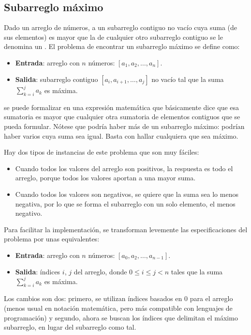 \subsection{Subarreglo máximo}

Dado un arreglo de números, a un subarreglo contiguo no vacío cuya suma (de sus elementos) es mayor que la de cualquier otro subarreglo contiguo se le denomina un . El problema de encontrar un subarreglo máximo se define como:
\begin{itemize}
  \item \textbf{Entrada}: arreglo con $n$ números: $[a_1, a_2,\ldots,a_n]$.
  \item \textbf{Salida}: subarreglo contiguo $[a_i, a_{i+1},\ldots,a_j]$ no vacío tal que la suma $\sum_{k=i}^j a_k$ es máxima.
\end{itemize}
 se puede formalizar en una expresión matemática que básicamente dice que esa sumatoria es mayor que cualquier otra sumatoria de elementos contiguos que se pueda formular. Nótese que podría haber más de un subarreglo máximo: podrían haber varios cuya suma sea igual. Basta con hallar cualquiera que sea máximo.

Hay dos tipos de instancias de este problema que son muy fáciles:
\begin{itemize}
  \item Cuando todos los valores del arreglo son positivos, la respuesta es todo el arreglo, porque todos los valores aportan a una mayor suma.
  \item Cuando todos los valores son negativos, se quiere que la suma sea lo menos negativa, por lo que se forma el subarreglo con un solo elemento, el menos negativo.
\end{itemize}

Para facilitar la implementación, se transforman levemente las especificaciones del problema por unas equivalentes:
\begin{itemize}
  \item \textbf{Entrada}: arreglo con $n$ números: $[a_0, a_2,\ldots,a_{n-1}]$.
  \item \textbf{Salida}: índices $i$, $j$ del arreglo, donde $0 \leq i \leq j < n$ tales que la suma $\sum_{k=i}^j a_k$ es máxima.
\end{itemize}
Los cambios son dos: primero, se utilizan índices basados en 0 para el arreglo (menos usual en notación matemática, pero más compatible con lenguajes de programación) y segundo, ahora se buscan los índices que delimitan el máximo subarreglo, en lugar del subarreglo como tal.

